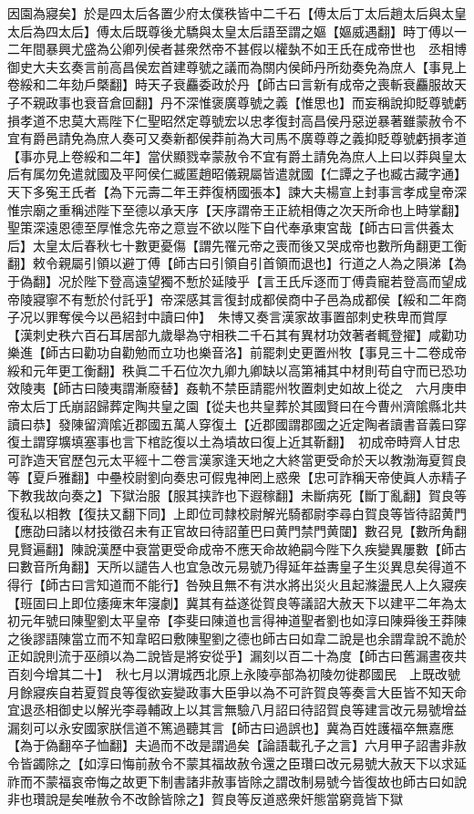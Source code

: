 因園為寢矣】於是四太后各置少府太僕秩皆中二千石【傅太后丁太后趙太后與太皇太后為四太后】傅太后既尊後尤驕與太皇太后語至謂之嫗【嫗威遇翻】時丁傅以一二年間暴興尤盛為公卿列侯者甚衆然帝不甚假以權埶不如王氏在成帝世也　丞相博御史大夫玄奏言前高昌侯宏首建尊號之議而為關内侯師丹所劾奏免為庶人【事見上卷綏和二年劾戶槩翻】時天子衰麤委政於丹【師古曰言新有成帝之喪斬衰麤服故天子不親政事也衰音倉回翻】丹不深惟褒廣尊號之義【惟思也】而妄稱說抑貶尊號虧損孝道不忠莫大焉陛下仁聖昭然定尊號宏以忠孝復封高昌侯丹惡逆暴著雖蒙赦令不宜有爵邑請免為庶人奏可又奏新都侯莽前為大司馬不廣尊尊之義抑貶尊號虧損孝道【事亦見上卷綏和二年】當伏顯戮幸蒙赦令不宜有爵土請免為庶人上曰以莽與皇太后有属勿免遣就國及平阿侯仁臧匿趙昭儀親屬皆遣就國【仁譚之子也臧古藏字通】天下多寃王氏者【為下元壽二年王莽復柄國張本】諫大夫楊宣上封事言孝成皇帝深惟宗廟之重稱述陛下至德以承天序【天序謂帝王正統相傳之次天所命也上時掌翻】聖策深遠恩德至厚惟念先帝之意豈不欲以陛下自代奉承東宮哉【師古曰言供養太后】太皇太后春秋七十數更憂傷【謂先罹元帝之喪而後又哭成帝也數所角翻更工衡翻】敕令親屬引領以避丁傅【師古曰引領自引首領而退也】行道之人為之隕涕【為于偽翻】况於陛下登高遠望獨不慙於延陵乎【言王氏斥逐而丁傅貴寵若登高而望成帝陵寢寧不有慙於付託乎】帝深感其言復封成都侯商中子邑為成都侯【綏和二年商子况以罪奪侯今以邑紹封中讀曰仲】　朱博又奏言漢家故事置部刺史秩卑而賞厚【漢刺史秩六百石耳居部九歲舉為守相秩二千石其有異材功效著者輒登擢】咸勸功樂進【師古曰勸功自勸勉而立功也樂音洛】前罷刺史更置州牧【事見三十二卷成帝綏和元年更工衡翻】秩眞二千石位次九卿九卿缺以高第補其中材則苟自守而已恐功效陵夷【師古曰陵夷謂漸廢替】姦軌不禁臣請罷州牧置刺史如故上從之　六月庚申帝太后丁氏崩詔歸葬定陶共皇之園【從夫也共皇葬於其國賢曰在今曹州濟隂縣北共讀曰恭】發陳留濟隂近郡國五萬人穿復土【近郡國謂郡國之近定陶者讀書音義曰穿復土謂穿壙填塞事也言下棺訖復以土為墳故曰復上近其靳翻】　初成帝時齊人甘忠可詐造天官歷包元太平經十二卷言漢家逢天地之大終當更受命於天以教渤海夏賀良等【夏戶雅翻】中壘校尉劉向奏忠可假鬼神罔上惑衆【忠可詐稱天帝使眞人赤精子下教我故向奏之】下獄治服【服其挟詐也下遐稼翻】未斷病死【斷丁亂翻】賀良等復私以相教【復扶又翻下同】上即位司隸校尉解光騎都尉李尋白賀良等皆待詔黄門【應劭曰諸以材技徵召未有正官故曰待詔董巴曰黄門禁門黄闥】數召見【數所角翻見賢遍翻】陳說漢歷中衰當更受命成帝不應天命故絶嗣今陛下久疾變異屢數【師古曰數音所角翻】天所以譴告人也宜急改元易號乃得延年益夀皇子生災異息矣得道不得行【師古曰言知道而不能行】咎殃且無不有洪水將出災火且起滌盪民人上久寢疾【班固曰上即位痿痺末年寖劇】冀其有益遂從賀良等議詔大赦天下以建平二年為太初元年號曰陳聖劉太平皇帝【李斐曰陳道也言得神道聖者劉也如淳曰陳舜後王莽陳之後謬語陳當立而不知韋昭曰敷陳聖劉之德也師古曰如韋二說是也余謂韋說不詭於正如說則流于巫顔以為二說皆是將安從乎】漏刻以百二十為度【師古曰舊漏晝夜共百刻今增其二十】　秋七月以渭城西北原上永陵亭部為初陵勿徙郡國民　上既改號月餘寢疾自若夏賀良等復欲妄變政事大臣爭以為不可許賀良等奏言大臣皆不知天命宜退丞相御史以解光李尋輔政上以其言無驗八月詔曰待詔賀良等建言改元易號增益漏刻可以永安國家朕信道不篤過聽其言【師古曰過誤也】冀為百姓護福卒無嘉應【為于偽翻卒子恤翻】夫過而不改是謂過矣【論語載孔子之言】六月甲子詔書非赦令皆蠲除之【如淳曰悔前赦令不蒙其福故赦令還之臣瓚曰改元易號大赦天下以求延祚而不蒙福哀帝悔之故更下制書諸非赦事皆除之謂改制易號今皆復故也師古曰如說非也瓚說是矣唯赦令不改餘皆除之】賀良等反道惑衆奸態當窮竟皆下獄